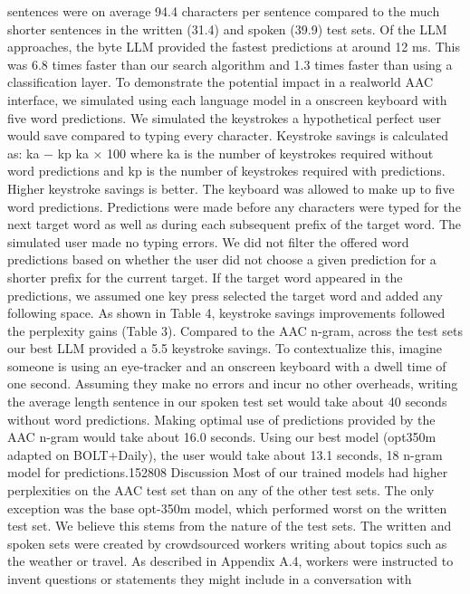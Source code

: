 sentences were on average 94.4 characters per sentence compared to the much shorter sentences in
the written (31.4) and spoken (39.9) test sets.
Of the LLM approaches, the byte LLM provided
the fastest predictions at around 12 ms. This was
6.8 times faster than our search algorithm and 1.3
times faster than using a classification layer.
To demonstrate the potential impact in a realworld AAC interface, we simulated using each language model in a onscreen keyboard with five word
predictions. We simulated the keystrokes a hypothetical perfect user would save compared to typing
every character. Keystroke savings is calculated as:
ka − kp
ka
× 100%
where ka is the number of keystrokes required
without word predictions and kp is the number
of keystrokes required with predictions. Higher
keystroke savings is better.
The keyboard was allowed to make up to five
word predictions. Predictions were made before
any characters were typed for the next target word
as well as during each subsequent prefix of the
target word. The simulated user made no typing errors. We did not filter the offered word predictions
based on whether the user did not choose a given
prediction for a shorter prefix for the current target.
If the target word appeared in the predictions, we
assumed one key press selected the target word and
added any following space.
As shown in Table 4, keystroke savings improvements followed the perplexity gains (Table 3).
Compared to the AAC n-gram, across the test sets
our best LLM provided a 5.5%
keystroke savings. To contextualize this, imagine
someone is using an eye-tracker and an onscreen
keyboard with a dwell time of one second. Assuming they make no errors and incur no other overheads, writing the average length sentence in our
spoken test set would take about 40 seconds without word predictions. Making optimal use of predictions provided by the AAC n-gram would take
about 16.0 seconds. Using our best model (opt350m adapted on BOLT+Daily), the user would
take about 13.1 seconds, 18%
n-gram model for predictions.152808 Discussion
Most of our trained models had higher perplexities
on the AAC test set than on any of the other test sets.
The only exception was the base opt-350m model,
which performed worst on the written test set. We
believe this stems from the nature of the test sets.
The written and spoken sets were created by crowdsourced workers writing about topics such as the
weather or travel. As described in Appendix A.4,
workers were instructed to invent questions or statements they might include in a conversation with
